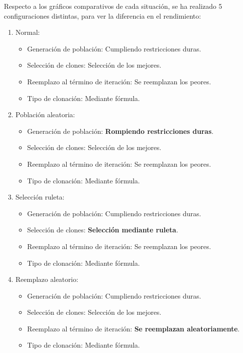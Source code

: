 Respecto a los gráficos comparativos de cada situación,
se ha realizado 5 configuraciones distintas, para ver la diferencia en el rendimiento:
\begin{enumerate}
	\item Normal:

		\begin{itemize}
			\item Generación de población: Cumpliendo restricciones duras.
			\item Selección de clones: Selección de los mejores.
			\item Reemplazo al término de iteración:  Se reemplazan los peores.
			\item Tipo de clonación: Mediante fórmula.
		\end{itemize}
	\item Población aleatoria:

		\begin{itemize}
			\item Generación de población: \textbf{Rompiendo restricciones duras}.
			\item Selección de clones: Selección de los mejores.
			\item Reemplazo al término de iteración:  Se reemplazan los peores.
			\item Tipo de clonación: Mediante fórmula.
		\end{itemize}

	\item Selección ruleta:

		\begin{itemize}
			\item Generación de población: Cumpliendo restricciones duras.
			\item Selección de clones: \textbf{Selección mediante ruleta}.
			\item Reemplazo al término de iteración:  Se reemplazan los peores.
			\item Tipo de clonación: Mediante fórmula.
		\end{itemize}

	\item Reemplazo aleatorio:

		\begin{itemize}
			\item Generación de población: Cumpliendo restricciones duras.
			\item Selección de clones: Selección de los mejores.
			\item Reemplazo al término de iteración:  \textbf{Se reemplazan aleatoriamente}.
			\item Tipo de clonación: Mediante fórmula.
		\end{itemize}


\end{enumerate}
